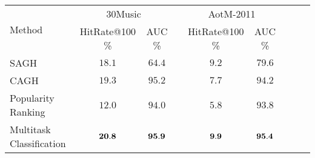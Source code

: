 \begin{tabular}{l*{4}{c}*{4}{c}}
\toprule
\multirow{2}{*}{Method}      & \multicolumn{2}{c}{30Music} && \multicolumn{2}{c}{AotM-2011} \\ \cmidrule{2-3} \cmidrule{5-6}
                             & HitRate@100 \% & AUC \% && HitRate@100 \% & AUC \% \\
\midrule
SAGH &                                 $18.1$ & $64.4$ &&          $9.2$ & $79.6$ \\
CAGH &                                 $19.3$ & $95.2$ &&          $7.7$ & $94.2$ \\
Popularity Ranking &                   $12.0$ & $94.0$ &&          $5.8$ & $93.8$ \\
Multitask Classification & ${\bf 20.8}$ & ${\bf 95.9}$ &&    ${\bf 9.9}$ & ${\bf 95.4}$ \\
\bottomrule
\end{tabular}
